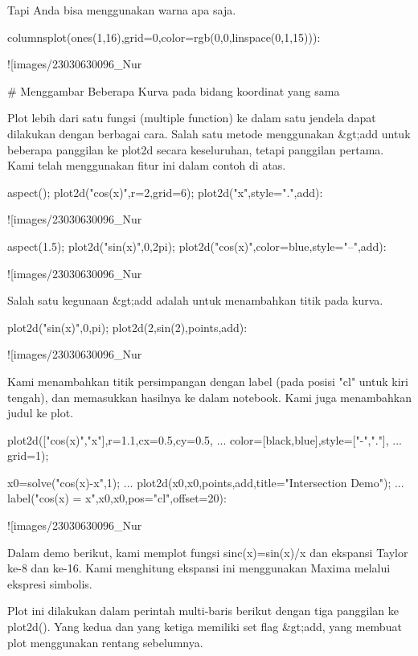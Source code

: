 \documentclass{article}
\begin{document}
Tapi Anda bisa menggunakan warna apa saja.


\>columnsplot(ones(1,16),grid=0,color=rgb(0,0,linspace(0,1,15))):


![images/23030630096_Nur%

# Menggambar Beberapa Kurva pada bidang koordinat yang sama

Plot lebih dari satu fungsi (multiple function) ke dalam satu jendela
dapat dilakukan dengan berbagai cara. Salah satu metode menggunakan
&gt;add untuk beberapa panggilan ke plot2d secara keseluruhan, tetapi
panggilan pertama. Kami telah menggunakan fitur ini dalam contoh di
atas.


\>aspect(); plot2d("cos(x)",r=2,grid=6); plot2d("x",style=".",\>add):


![images/23030630096_Nur%

\>aspect(1.5); plot2d("sin(x)",0,2pi); plot2d("cos(x)",color=blue,style="--",\>add):


![images/23030630096_Nur%

Salah satu kegunaan &gt;add adalah untuk menambahkan titik pada kurva.


\>plot2d("sin(x)",0,pi); plot2d(2,sin(2),\>points,\>add):


![images/23030630096_Nur%

Kami menambahkan titik persimpangan dengan label (pada posisi "cl"
untuk kiri tengah), dan memasukkan hasilnya ke dalam notebook. Kami
juga menambahkan judul ke plot.


\>plot2d(["cos(x)","x"],r=1.1,cx=0.5,cy=0.5, ...  
\>     color=[black,blue],style=["-","."], ...  
\>     grid=1);

\>x0=solve("cos(x)-x",1);  ...  
\>     plot2d(x0,x0,\>points,\>add,title="Intersection Demo");  ...  
\>     label("cos(x) = x",x0,x0,pos="cl",offset=20):


![images/23030630096_Nur%

Dalam demo berikut, kami memplot fungsi sinc(x)=sin(x)/x dan ekspansi
Taylor ke-8 dan ke-16. Kami menghitung ekspansi ini menggunakan Maxima
melalui ekspresi simbolis.


Plot ini dilakukan dalam perintah multi-baris berikut dengan tiga
panggilan ke plot2d(). Yang kedua dan yang ketiga memiliki set flag
&gt;add, yang membuat plot menggunakan rentang sebelumnya.
\end{document}
